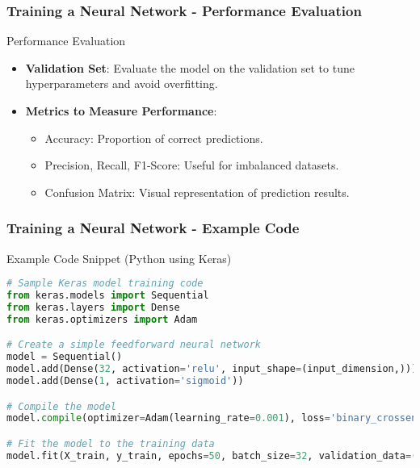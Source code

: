 \documentclass[aspectratio=169]{beamer}
\begin{document}
\begin{frame}[fragile]
    \frametitle{Training a Neural Network - Performance Evaluation}
    \begin{block}{Performance Evaluation}
        \begin{itemize}
            \item \textbf{Validation Set}: Evaluate the model on the validation set to tune hyperparameters and avoid overfitting.
            \item \textbf{Metrics to Measure Performance}:
                \begin{itemize}
                    \item Accuracy: Proportion of correct predictions.
                    \item Precision, Recall, F1-Score: Useful for imbalanced datasets.
                    \item Confusion Matrix: Visual representation of prediction results.
                \end{itemize}
        \end{itemize}
    \end{block}
\end{frame}

\begin{frame}[fragile]
    \frametitle{Training a Neural Network - Example Code}
    \begin{block}{Example Code Snippet (Python using Keras)}
        \begin{lstlisting}[language=Python]
# Sample Keras model training code
from keras.models import Sequential
from keras.layers import Dense
from keras.optimizers import Adam

# Create a simple feedforward neural network
model = Sequential()
model.add(Dense(32, activation='relu', input_shape=(input_dimension,)))
model.add(Dense(1, activation='sigmoid'))

# Compile the model
model.compile(optimizer=Adam(learning_rate=0.001), loss='binary_crossentropy', metrics=['accuracy'])

# Fit the model to the training data
model.fit(X_train, y_train, epochs=50, batch_size=32, validation_data=(X_val, y_val))
        \end{lstlisting}
    \end{block}
\end{frame}
\end{document}
